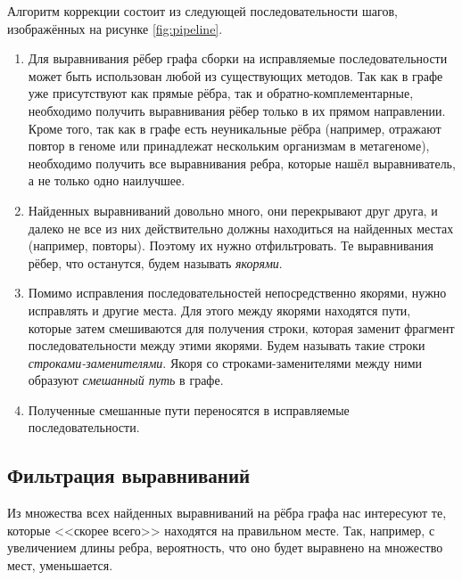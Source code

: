 \documentclass[14pt]{matmex-diploma-custom}
\begin{document}
Алгоритм коррекции состоит из следующей последовательности шагов, изображённых на рисунке \ref{fig:pipeline}.
\begin{enumerate}
    \item Для выравнивания рёбер графа сборки на исправляемые последовательности может быть использован любой из существующих методов. Так как в графе уже присутствуют как прямые рёбра, так и обратно-комплементарные, необходимо получить выравнивания рёбер только в их прямом направлении. Кроме того, так как в графе есть неуникальные рёбра (например, отражают повтор в геноме или принадлежат нескольким организмам в метагеноме), необходимо получить все выравнивания ребра, которые нашёл выравниватель, а не только одно наилучшее.
    \item Найденных выравниваний довольно много, они перекрывают друг друга, и далеко не все из них действительно должны находиться на найденных местах (например, повторы). Поэтому их нужно отфильтровать. Те выравнивания рёбер, что останутся, будем называть \textit{якорями}.
    \item \begin{sloppypar} Помимо исправления последовательностей непосредственно якорями, нужно исправлять и другие места. Для этого между якорями находятся пути, которые затем смешиваются для получения строки, которая заменит фрагмент последовательности между этими якорями. Будем называть такие строки \textit{строками-заменителями}. Якоря со строками-заменителями между ними образуют \textit{смешанный путь} в графе. \end{sloppypar}
    \item Полученные смешанные пути переносятся в исправляемые последовательности.
\end{enumerate}

\subsection{Фильтрация выравниваний}
Из множества всех найденных выравниваний на рёбра графа нас интересуют те, которые <<скорее всего>> находятся на правильном месте. Так, например, с увеличением длины ребра, вероятность, что оно будет выравнено на множество мест, уменьшается.
\end{document}
